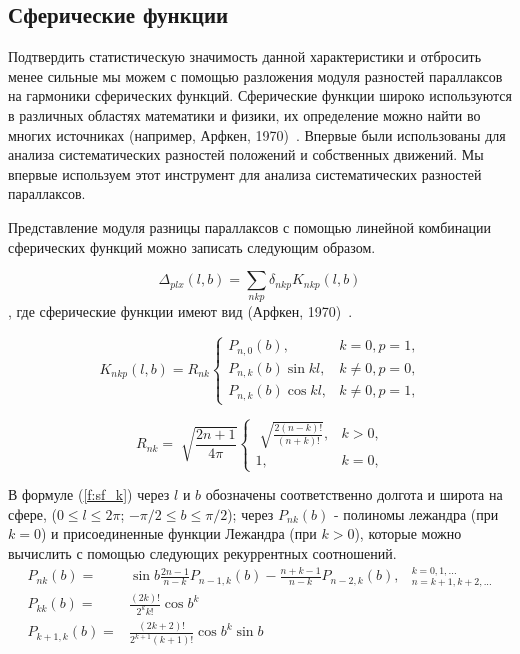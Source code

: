 \documentclass[14pt]{article} %
\begin{document}
\subsection{Сферические функции}\label{sistem}  
Подтвердить статистическую значимость данной характеристики и отбросить менее сильные мы можем с помощью разложения модуля разностей параллаксов на гармоники сферических функций. Сферические функции широко используются в различных областях математики и физики, их определение можно найти во многих источниках (например, Арфкен, 1970)~\cite{book:arfken}. Впервые  были использованы для анализа систематических разностей положений и собственных движений. Мы впервые используем этот инструмент для анализа систематических разностей параллаксов.
 
Представление модуля разницы параллаксов с помощью линейной комбинации сферических функций можно записать следующим образом.


$$ \Delta_{plx} (l,b) = \sum_{nkp}\delta_{nkp}K_{nkp}(l,b) $$,
где сферические функции имеют вид (Арфкен, 1970)~\cite{book:arfken}.

\begin{equation}\label{f:sf_k}
K_{nkp}(l,b) = R_{nk} \left\{ \begin{array}{ll}
P_{n,0}(b), & \textrm{$k=0, p=1$,}\\
P_{n,k}(b)\sin{kl}, & \textrm{$k\neq0, p=0$,}\\
P_{n,k}(b)\cos{kl}, & \textrm{$k\neq0, p=1$,}
\end{array} \right.
\end{equation}

\begin{equation}
R_{nk} = \sqrt[]{\frac{2n+1}{4\pi}} \left\{ \begin{array}{cc}
\sqrt[]{\frac{2(n-k)!}{(n+k)!}}, & \textrm{$k>0$,}\\
1, & \textrm{$k=0$,}
\end{array} \right.
\end{equation}

В формуле (\ref{f:sf_k}) через $l$ и $b$ обозначены соответственно долгота и широта на сфере, ($0 \leq l \leq 2\pi$; $-\pi/2\leq b \leq \pi/2$); через $P_{nk}(b)$ - полиномы лежандра (при $k = 0$) и присоединенные функции Лежандра (при $k > 0$), которые можно вычислить с помощью следующих рекуррентных соотношений. 
\begin{equation}
\begin{array}{rll}
P_{nk}(b)=&\sin{b\frac{2n-1}{n-k}}P_{n-1,k}(b)-\frac{n+k-1}{n-k}P_{n-2,k}(b), & {}^{k=0,1,...}_{n=k+1,k+2,...}\\
P_{kk}(b)=&\frac{(2k)!}{2^{k}k!}{\cos{b}}^{k}\\
P_{k+1,k}(b)=&\frac{(2k+2)!}{2^{k+1}(k+1)!}{\cos{b}}^{k}\sin{b}
\end{array}
\end{equation}
\end{document}

